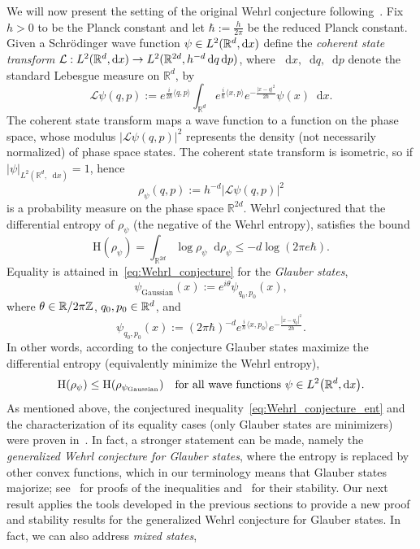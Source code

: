 \documentclass[10pt]{amsart}
\theoremstyle{definition}\newtheorem{defi}[theo]{Definition}\newtheorem{rema}[theo]{Remark}\newtheorem{exam}[theo]{Example}\newtheorem{exem}[theo]{Example}\newtheorem{nota}[theo]{Notation}
\newcommand{\R}{\mathbb R}
\newcommand{\bbZ}{\mathbb Z}
\newcommand{\Ent}{\mathrm H}
\newcommand{\prob}{\rho}
\newcommand*\diff{\mathop{}\!\mathrm{d}}
\newcommand{\cotrans}{\mathcal L}
\newcommand{\wave}{\psi}
\newcommand{\waveg}{\psi_{\mathrm{Gaussian}}}
\renewcommand*{\to}{\mathchoice{\longrightarrow}{\rightarrow}{\rightarrow}{\rightarrow}}
\let\originalleft\left
\let\originalright\right
\renewcommand{\left}{\mathopen{}\mathclose\bgroup\originalleft}
\renewcommand{\right}{\aftergroup\egroup\originalright}
\let\oldin\in
\renewcommand{\in}{\mathchoice{\oldin}{\oldin}{\,\oldin\,}{\,\oldin\,}}
\begin{document}
We will now present the setting of the original Wehrl conjecture following~\cite{MR1105661}. Fix $h>0$ to be the Planck constant and let $\hbar:=\frac{h}{2\pi}$ be the reduced Planck constant. Given a Schr\"odinger wave function $\wave\in L^2(\R^d,\diff x)$ define the \emph{coherent state transform} $\cotrans:L^2(\R^d,\diff x)\to L^2(\R^{2d},h^{-d}\diff q\diff p)$, where $\diff x,\diff q,\diff p$ denote the standard Lebesgue measure on $\R^{d}$, by
\begin{equation}\label{eq:conerent_transform_def}
\cotrans \wave(q,p):=e^{\frac{i}{2\hbar}\langle q,p\rangle}\int_{\R^{d}}e^{\frac{i}{\hbar}\langle x,p\rangle}e^{-\frac{|x-q|^2}{2\hbar}}\wave(x)\diff x.
\end{equation}
The coherent state transform maps a wave function to a function on the phase space, whose modulus $|\cotrans \wave(q,p)|^2$ represents the density (not necessarily normalized) of phase space states. The coherent state transform is isometric, so if $|\psi|_{L^2(\R^{d},\diff x)}=1$, hence
\begin{equation}\label{eq:phase_prob_def}
\prob_{\wave}(q,p):=h^{-d}|\cotrans \wave(q,p)|^2
\end{equation}
is a probability measure on the phase space $\R^{2d}$. Wehrl conjectured that the differential entropy of $\prob_{\wave}$ (the negative of the Wehrl entropy), satisfies the bound
\begin{equation}\label{eq:Wehrl_conjecture}
\Ent(\prob_{\wave})=\int_{\R^{2d}}\log \prob_{\wave} \diff \prob_{\wave} \le -d\log (2\pi e\hbar).
\end{equation}
Equality is attained in~\eqref{eq:Wehrl_conjecture} for the \emph{Glauber states},
\begin{equation}\label{eq:Gaussian_state}
\waveg(x):=e^{i\theta}\wave_{q_0,p_0}(x),
\end{equation}
where $\theta \in \R/ 2\pi\bbZ $, $q_0,p_0\in\R^{d}$, and
\[
\wave_{q_0,p_0}(x):=(2\pi\hbar)^{-d} e^{\frac{i}{\hbar}\langle x,p_0\rangle}e^{-\frac{|x-q_0|^2}{2\hbar}}.
\]
In other words, according to the conjecture Glauber states maximize the differential entropy (equivalently minimize the Wehrl entropy),
\begin{equation}\label{eq:Wehrl_conjecture_ent}
\Ent(\prob_{\wave})\le \Ent\left(\prob_{\waveg}\right)\quad\text{for all wave functions }\wave\in L^2\left(\R^d,\diff x\right).
\end{equation}
As mentioned above, the conjectured inequality~\eqref{eq:Wehrl_conjecture_ent} and the characterization of its equality cases (only Glauber states are minimizers) were proven in~\cite{MR1105661,MR0506364}. In fact, a stronger statement can be made, namely the \emph{generalized Wehrl conjecture for Glauber states}, where the entropy is replaced by other convex functions, which in our terminology means that Glauber states majorize; see~\cite{MR4580699,kulikov2022monotonicity} for proofs of the inequalities and~\cite{frank2023generalized} for their stability. Our next result applies the tools developed in the previous sections to provide a new proof and stability results for the generalized Wehrl conjecture for Glauber states. In fact, we can also address \emph{mixed states},
\end{document}
